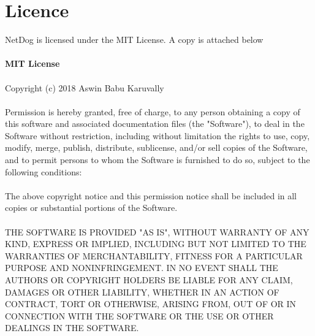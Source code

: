 \section{Licence}
NetDog is licensed under the MIT License. A copy is attached below\\\\
\textbf{MIT License}\\\\
Copyright (c) 2018 Aswin Babu Karuvally\\\\
Permission is hereby granted, free of charge, to any person obtaining a copy
of this software and associated documentation files (the "Software"), to deal
in the Software without restriction, including without limitation the rights
to use, copy, modify, merge, publish, distribute, sublicense, and/or sell
copies of the Software, and to permit persons to whom the Software is
furnished to do so, subject to the following conditions:\\\\
The above copyright notice and this permission notice shall be included in all
copies or substantial portions of the Software.\\\\
THE SOFTWARE IS PROVIDED "AS IS", WITHOUT WARRANTY OF ANY KIND, EXPRESS OR
IMPLIED, INCLUDING BUT NOT LIMITED TO THE WARRANTIES OF MERCHANTABILITY,
FITNESS FOR A PARTICULAR PURPOSE AND NONINFRINGEMENT. IN NO EVENT SHALL THE 
AUTHORS OR COPYRIGHT HOLDERS BE LIABLE FOR ANY CLAIM, DAMAGES OR OTHER
LIABILITY, WHETHER IN AN ACTION OF CONTRACT, TORT OR OTHERWISE, ARISING FROM,
OUT OF OR IN CONNECTION WITH THE SOFTWARE OR THE USE OR OTHER DEALINGS IN THE 
SOFTWARE.

